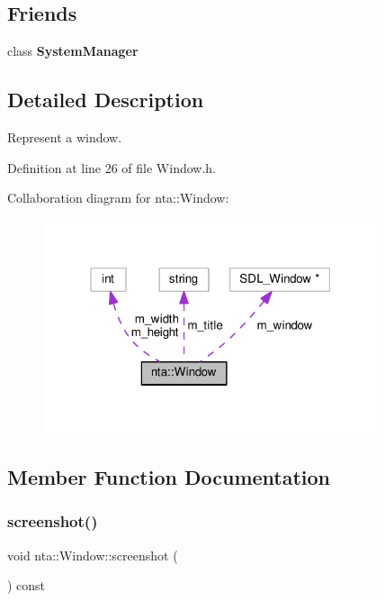 \subsection*{Friends}
\begin{DoxyCompactItemize}
\item 
\mbox{\label{classnta_1_1Window_ab1ef2aa9992dd8ae85793e1a1f980e1e}} 
class {\bfseries System\+Manager}
\end{DoxyCompactItemize}


\subsection{Detailed Description}
Represent a window. 

Definition at line 26 of file Window.\+h.



Collaboration diagram for nta\+:\+:Window\+:\nopagebreak
\begin{figure}[H]
\begin{center}
\leavevmode
\includegraphics[width=279pt]{da/daa/classnta_1_1Window__coll__graph}
\end{center}
\end{figure}


\subsection{Member Function Documentation}
\mbox{\label{classnta_1_1Window_aa144f6bb014aaad3c91c3f3e6ad56f9c}} 
\subsubsection{\texorpdfstring{screenshot()}{screenshot()}}
{\footnotesize\ttfamily void nta\+::\+Window\+::screenshot (\begin{DoxyParamCaption}{ }\end{DoxyParamCaption}) const}



